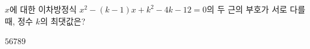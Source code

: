 \hspace*{2mm}\begin{minipage}[t]{\dimexpr\linewidth-2mm\relax}\vspace{0pt}
$x$에 대한 이차방정식 $x^2-(k-1)x+k^2-4k-12=0$의 두 근의 부호가 서로 다를 때, 정수 $k$의 최댓값은?
\begin{choices32}{$5$}{$6$}{$7$}{$8$}{$9$}\end{choices32}\end{minipage}
